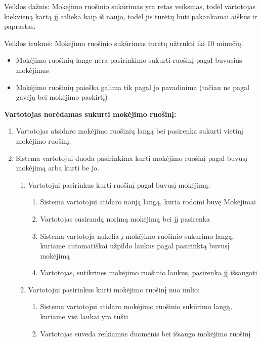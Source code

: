 \documentclass{VUMIFPSkursinis}
\begin{document}
Veiklos dažnis: Mokėjimo ruošinio sukūrimas yra retas veiksmas, todėl vartotojas kiekvieną kartą jį atlieka kaip iš naujo, todėl jis turėtų būti pakankamai aiškus ir paprastas. \par
Veiklos trukmė: Mokėjimo ruošinio sukūrimas turėtų užtrukti iki 10 minučių.
\begin{itemize}
	\item Mokėjimo ruošinių lange nėra pasirinkimo sukurti ruošinį pagal buvusius mokėjimus
	\item Mokėjimo ruošinių paieška galima tik pagal jo pavadinima (tačiau ne pagal gavėją bei mokėjimo paskirtį)
\end{itemize}
\begin{center}
	\textbf{Vartotojas norėdamas sukurti mokėjimo ruošinį:}
\end{center}
\begin{enumerate}
	\item Vartotojas atsidaro mokėjimo ruošinių langą bei pasirenka sukurti vietinį mokėjimo ruošinį.
	\item Sistema vartotojui duoda pasirinkima kurti mokėjimo ruošinį pagal buvusį mokėjimą arba kurti be jo.
	\begin{enumerate}
		\item Vartotojui pasirinkus kurti ruošinį pagal buvusį mokėjimą:
		\begin{enumerate}
			\item Sistema vartotojui atidaro naują langą, kuria rodomi buvę Mokėjimai
			\item Vartotojas susirandą norimą mokėjimą bei jį pasirenka
			\item Sistema vartotoja nukelia į mokėjimo ruošinio sukurimo langą, kuriame automatiškai užpildo laukus pagal pasirinktą buvusį mokėjimą
			\item Vartotojas, sutikrines mokėjimo ruošinio laukus, pasirenka jį išsaugoti
		\end{enumerate}
		\item Vartotojui pasirinkus kurti mokėjimo ruošinį nuo nulio:
		\begin{enumerate}
			\item Sistema vartotojui atidaro mokėjimo ruošinio sukūrimo langą, kuriame visi laukai yra tušti
			\item Vartotojas suveda reikiamus duomenis bei išsaugo mokėjimo ruošinį
		\end{enumerate}
	\end{enumerate}
\end{enumerate}
\end{document}
